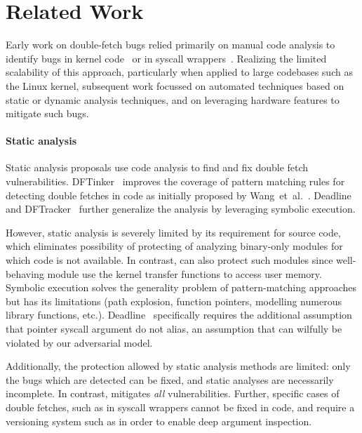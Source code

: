 \section{Related Work}

Early work on double-fetch bugs relied primarily on manual
code analysis to identify bugs in kernel code~\cite{YangCSS12, twizsgrakky07ring0}
or in syscall wrappers~\cite{watson2007exploiting}.
Realizing the limited scalability of this approach, particularly
when applied to large codebases such as the Linux kernel, subsequent 
work focussed on automated techniques based on static or dynamic 
analysis techniques, and on leveraging hardware features to mitigate
such bugs.


\paragraph{Static analysis}
%
Static analysis proposals use code analysis to find and fix double fetch
vulnerabilities.
DFTinker~\cite{dftinker} improves the coverage of pattern matching rules
for detecting double fetches in code as initially proposed by Wang~et~al.~\cite{wang2017double}.
Deadline~\cite{deadline} and DFTracker~\cite{wang2019dftracker} further
generalize the analysis by leveraging symbolic execution.

However, static analysis is severely limited by its requirement for
source code, which eliminates possibility of protecting of analyzing
binary-only modules for which code is not available.
In contrast, \midas can also protect such modules since well-behaving
module use the kernel transfer functions to access user memory.
Symbolic execution solves the generality problem of pattern-matching
approaches but has its limitations (path explosion, function pointers,
modelling numerous library functions, etc.).
Deadline~\cite{deadline} specifically requires the additional assumption
that pointer syscall argument do not alias, an assumption that can
wilfully be violated by our adversarial model.

Additionally, the protection allowed by static analysis methods are
limited: only the bugs which are detected can be fixed, and static
analyses are necessarily incomplete.
In contrast, \midas mitigates \emph{all} \tocttou vulnerabilities.
Further, specific cases of double fetches, such as in syscall wrappers
cannot be fixed in code, and require a versioning system such as
\midas in order to enable deep argument inspection.

